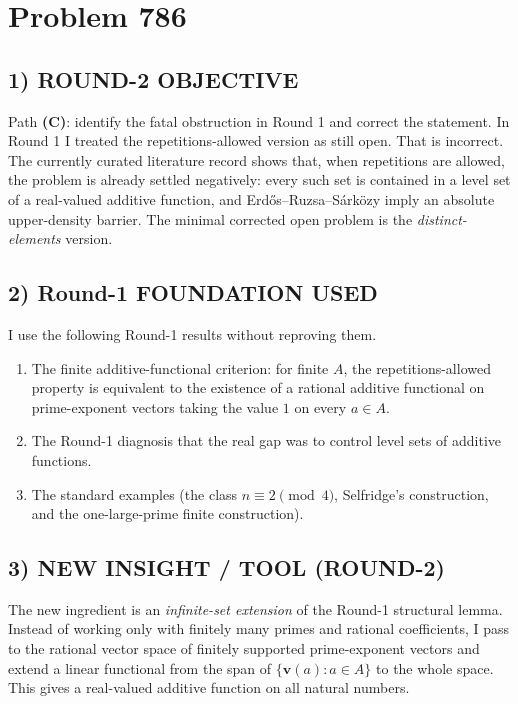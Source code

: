 \section{Problem 786}

\subsection*{1) ROUND-2 OBJECTIVE}
Path \textbf{(C)}: identify the fatal obstruction in Round 1 and correct the statement. In Round 1 I treated the repetitions-allowed version as still open. That is incorrect. The currently curated literature record shows that, when repetitions are allowed, the problem is already settled negatively: every such set is contained in a level set of a real-valued additive function, and Erd\H{o}s--Ruzsa--S\'ark\"ozy imply an absolute upper-density barrier. The minimal corrected open problem is the \emph{distinct-elements} version.

\subsection*{2) Round-1 FOUNDATION USED}
I use the following Round-1 results without reproving them.
\begin{enumerate}
\item The finite additive-functional criterion: for finite $A$, the repetitions-allowed property is equivalent to the existence of a rational additive functional on prime-exponent vectors taking the value $1$ on every $a \in A$.
\item The Round-1 diagnosis that the real gap was to control level sets of additive functions.
\item The standard examples (the class $n \equiv 2 \pmod 4$, Selfridge's construction, and the one-large-prime finite construction).
\end{enumerate}

\subsection*{3) NEW INSIGHT / TOOL (ROUND-2)}
The new ingredient is an \emph{infinite-set extension} of the Round-1 structural lemma. Instead of working only with finitely many primes and rational coefficients, I pass to the rational vector space of finitely supported prime-exponent vectors and extend a linear functional from the span of $\{\mathbf v(a): a \in A\}$ to the whole space. This gives a real-valued additive function on all natural numbers.

